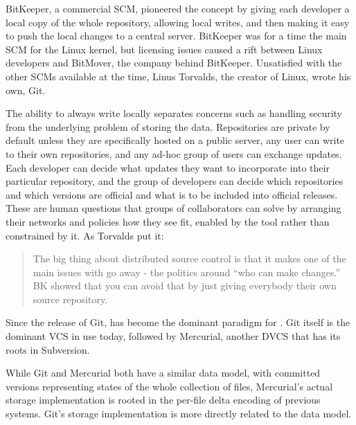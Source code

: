 BitKeeper, a commercial \gls{SCM}, pioneered the  concept by giving each developer a local copy of the whole
repository, allowing local writes, and then making it easy to push the local
changes to a central server. BitKeeper was for a time the main
\acrlong{SCM} for the Linux kernel, but licensing issues caused a rift between
Linux developers and BitMover, the company behind BitKeeper.
Unsatisfied with the other \glspl{SCM} available at the time, Linus Torvalds,
the creator of Linux, wrote his own, Git.

The ability to always write locally separates concerns such as handling security
from the underlying problem of storing the data. Repositories are private by
default unless they are specifically hosted on a public server, any user can
write to their own repositories, and any ad-hoc group of users can exchange
updates. Each developer can decide what updates they want to incorporate into
their particular repository, and the group of developers can decide which
repositories and which versions are official and what is to be included into
official releases. These are human questions that groups of collaborators can
solve by arranging their networks and policies how they see fit, enabled by the
tool rather than constrained by it. As Torvalds put it:

\blockcquote{git_10_years_interview}{The big thing about distributed source
    control is that it makes one of the main issues with  go
    away - the politics around \enquote{who can make changes.} BK
     showed that you can avoid that by just giving everybody
their own source repository. }


Since the release of Git,  has become
the dominant paradigm for . Git itself is
the dominant \gls{VCS} in use today, followed by Mercurial, another \gls{DVCS}
that has its roots in Subversion.

While Git and Mercurial both have a similar data model, with committed versions
representing states of the whole collection of files, Mercurial's actual storage
implementation is rooted in the per-file delta encoding of previous systems.
Git's storage implementation is more directly related to the data model.

